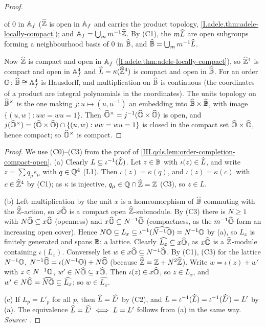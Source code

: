 \begin{proof}
\begin{enumerate}[label=(C\arabic*)]
  of $0$ in $\mathbb{A}_f$ ($\widehat{\mathbb{Z}}$ is open in $\mathbb{A}_f$ and carries the product topology, \cref{I.adele.thm:adele-locally-compact}); and $\mathbb{A}_f=\bigcup_mm^{-1}\widehat{\mathbb{Z}}$. By
  (C1), the $m\widehat{L}$ are open subgroups forming a neighbourhood basis of $0$ in $\widehat{\mathbb{B}}$, and $\widehat{\mathbb{B}}=\bigcup_mm^{-1}\widehat{L}$.
\end{enumerate}
Now $\widehat{\mathbb{Z}}$ is compact and open in $\mathbb{A}_f$ (\cref{I.adele.thm:adele-locally-compact}), so $\widehat{\mathbb{Z}}^4$ is compact and open in $\mathbb{A}_f^4$ and $\widehat{L}=\kappa(\widehat{\mathbb{Z}}^4)$ is
compact and open in $\widehat{\mathbb{B}}$. For an order $\mathbb{O}$: $\widehat{\mathbb{B}}\cong\mathbb{A}_f^4$ is Hausdorff, and multiplication on $\widehat{\mathbb{B}}$ is continuous (the coordinates of a
product are integral polynomials in the coordinates). The units topology on $\widehat{\mathbb{B}}^\times$ is the one making $j\colon u\mapsto(u,u^{-1})$ an embedding into
$\widehat{\mathbb{B}}\times\widehat{\mathbb{B}}$, with image $\{(u,w):uw=wu=1\}$. Then $\widehat{\mathbb{O}}^\times=j^{-1}(\widehat{\mathbb{O}}\times\widehat{\mathbb{O}})$ is open, and $j(\widehat{\mathbb{O}}^\times)=(\widehat{\mathbb{O}}\times\widehat{\mathbb{O}})\cap
\{(u,w):uw=wu=1\}$ is closed in the compact set $\widehat{\mathbb{O}}\times\widehat{\mathbb{O}}$, hence compact; so $\widehat{\mathbb{O}}^\times$ is compact.
\end{proof}

\begin{theorem}
\end{theorem}
\begin{proof}
We use (C0)--(C3) from the proof of \cref{III.qcls.lem:order-completion-compact-open}.
(a) Clearly $L\subseteq\iota^{-1}(\widehat{L})$. Let $z\in\mathbb{B}$ with $\iota(z)\in\widehat{L}$, and write $z=\sum q_\mu e_\mu$ with $q\in\mathbb{Q}^4$ (L1). Then
$\iota(z)=\kappa(q)$, and $\iota(z)=\kappa(c)$ with $c\in\widehat{\mathbb{Z}}^4$ by (C1); as $\kappa$ is injective, $q_\mu\in\mathbb{Q}\cap\widehat{\mathbb{Z}}=\mathbb{Z}$ (C3), so $z\in L$.

(b) Left multiplication by the unit $x$ is a homeomorphism of $\widehat{\mathbb{B}}$ commuting with the $\widehat{\mathbb{Z}}$-action, so $x\widehat{\mathbb{O}}$ is a compact open $\widehat{\mathbb{Z}}$-submodule. By (C3)
there is $N\ge1$ with $N\widehat{\mathbb{O}}\subseteq x\widehat{\mathbb{O}}$ (openness) and $x\widehat{\mathbb{O}}\subseteq N^{-1}\widehat{\mathbb{O}}$ (compactness, as the $m^{-1}\widehat{\mathbb{O}}$ form an increasing open
cover). Hence $N\mathbb{O}\subseteq L_x\subseteq\iota^{-1}(\widehat{N^{-1}\mathbb{O}})=N^{-1}\mathbb{O}$ by (a), so $L_x$ is finitely generated and spans $\mathbb{B}$: a lattice.
Clearly $\widehat{L_x}\subseteq x\widehat{\mathbb{O}}$, as $x\widehat{\mathbb{O}}$ is a $\widehat{\mathbb{Z}}$-module containing $\iota(L_x)$. Conversely let $w\in x\widehat{\mathbb{O}}\subseteq N^{-1}\widehat{\mathbb{O}}$. By
(C1), (C3) for the lattice $N^{-1}\mathbb{O}$, $N^{-1}\widehat{\mathbb{O}}=\iota(N^{-1}\mathbb{O})+N\widehat{\mathbb{O}}$ (because $\widehat{\mathbb{Z}}=\mathbb{Z}+N^2\widehat{\mathbb{Z}}$). Write $w=\iota(z)+w'$ with
$z\in N^{-1}\mathbb{O}$, $w'\in N\widehat{\mathbb{O}}\subseteq x\widehat{\mathbb{O}}$. Then $\iota(z)\in x\widehat{\mathbb{O}}$, so $z\in L_x$, and $w'\in N\widehat{\mathbb{O}}=\widehat{N\mathbb{O}}\subseteq\widehat{L_x}$; so
$w\in\widehat{L_x}$.

(c) If $L_p=L'_p$ for all $p$, then $\widehat{L}=\widehat{L'}$ by (C2), and $L=\iota^{-1}(\widehat{L})=\iota^{-1}(\widehat{L'})=L'$ by (a). The equivalence
$\widehat{L}=\widehat{L'}\iff L=L'$ follows from (a) in the same way. \emph{Source:} \cite[§§9.4--9.5, §27.6]{Voi}.
\end{proof}

